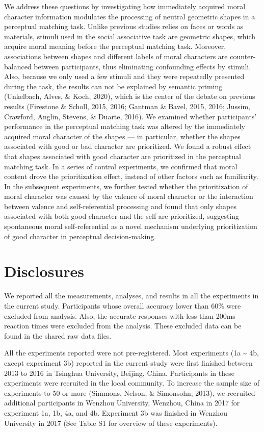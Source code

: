 \documentclass[
  man]{apa6}
\begin{document}
We address these questions by investigating how immediately acquired moral character information modulates the processing of neutral geometric shapes in a perceptual matching task. Unlike previous studies relies on faces or words as materials, stimuli used in the social associative task are geometric shapes, which acquire moral meaning before the perceptual matching task. Moreover, associations between shapes and different labels of moral characters are counter-balanced between participants, thus eliminating confounding effects by stimuli. Also, because we only used a few stimuli and they were repeatedly presented during the task, the results can not be explained by semantic priming (Unkelbach, Alves, \& Koch, 2020), which is the center of the debate on previous results (Firestone \& Scholl, 2015, 2016; Gantman \& Bavel, 2015, 2016; Jussim, Crawford, Anglin, Stevens, \& Duarte, 2016). We examined whether participants' performance in the perceptual matching task was altered by the immediately acquired moral character of the shapes --- in particular, whether the shapes associated with good or bad character are prioritized. We found a robust effect that shapes associated with good character are prioritized in the perceptual matching task. In a series of control experiments, we confirmed that moral content drove the prioritization effect, instead of other factors such as familiarity. In the subsequent experiments, we further tested whether the prioritization of moral character was caused by the valence of moral character or the interaction between valence and self-referential processing and found that only shapes associated with both good character and the self are prioritized, suggesting spontaneous moral self-referential as a novel mechanism underlying prioritization of good character in perceptual decision-making.

\hypertarget{disclosures}{%
\section{Disclosures}\label{disclosures}}

We reported all the measurements, analyses, and results in all the experiments in the current study. Participants whose overall accuracy lower than 60\% were excluded from analysis. Also, the accurate responses with less than 200ms reaction times were excluded from the analysis. These excluded data can be found in the shared raw data files.

All the experiments reported were not pre-registered. Most experiments (1a \textasciitilde{} 4b, except experiment 3b) reported in the current study were first finished between 2013 to 2016 in Tsinghua University, Beijing, China. Participants in these experiments were recruited in the local community. To increase the sample size of experiments to 50 or more (Simmons, Nelson, \& Simonsohn, 2013), we recruited additional participants in Wenzhou University, Wenzhou, China in 2017 for experiment 1a, 1b, 4a, and 4b. Experiment 3b was finished in Wenzhou University in 2017 (See Table S1 for overview of these experiments).
\end{document}
